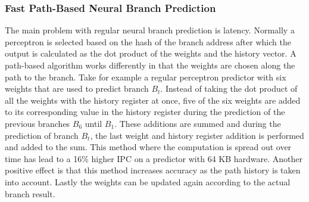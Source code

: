 \subsubsection{Fast Path-Based Neural Branch Prediction}
The main problem with regular neural branch prediction is latency.
Normally a perceptron is selected based on the hash of the branch address after which the output is calculated as the dot product of the weights and the history vector.
A path-based algorithm works differently in that the weights are chosen along the path to the branch.
Take for example a regular perceptron predictor with six weights that are used to predict branch $B_t$.
Instead of taking the dot product of all the weights with the history register at once, five of the six weights are added to its corresponding value in the history register during the prediction of the previous branches $B_6$ until $B_1$.
These additions are summed and during the prediction of branch $B_t$, the last weight and history register addition is performed and added to the sum.
This method where the computation is spread out over time has lead to a 16\% higher IPC on a predictor with 64 KB hardware.
Another positive effect is that this method increases accuracy as the path history is taken into account.
Lastly the weights can be updated again according to the actual branch result.